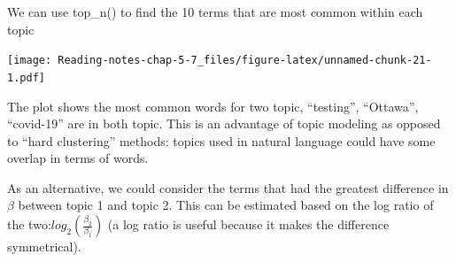 \documentclass[]{article}
\newenvironment{Shaded}{\begin{snugshade}}{\end{snugshade}}
\newcommand{\DataTypeTok}[1]{\textcolor[rgb]{0.13,0.29,0.53}{#1}}
\newcommand{\DecValTok}[1]{\textcolor[rgb]{0.00,0.00,0.81}{#1}}
\newcommand{\KeywordTok}[1]{\textcolor[rgb]{0.13,0.29,0.53}{\textbf{#1}}}
\newcommand{\NormalTok}[1]{#1}
\newcommand{\OperatorTok}[1]{\textcolor[rgb]{0.81,0.36,0.00}{\textbf{#1}}}
\newcommand{\OtherTok}[1]{\textcolor[rgb]{0.56,0.35,0.01}{#1}}
\newcommand{\StringTok}[1]{\textcolor[rgb]{0.31,0.60,0.02}{#1}}
\begin{document}
We can use top\_n() to find the 10 terms that are most common within
each topic

\begin{Shaded}
\end{Shaded}

\texttt{[image: Reading-notes-chap-5-7\_files/figure-latex/unnamed-chunk-21-1.pdf]}

The plot shows the most common words for two topic, ``testing'',
``Ottawa'', ``covid-19'' are in both topic. This is an advantage of
topic modeling as opposed to ``hard clustering'' methods: topics used in
natural language could have some overlap in terms of words.

As an alternative, we could consider the terms that had the greatest
difference in\\
\(β\) between topic 1 and topic 2. This can be estimated based on the
log ratio of the two:\(log_2(\frac{\beta_2}{\beta_1})\) (a log ratio is
useful because it makes the difference symmetrical).
\end{document}
